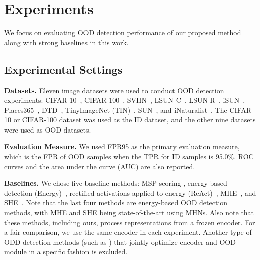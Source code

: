\section{Experiments}

We focus on evaluating OOD detection performance of our proposed method along with strong baselines in this work.

\subsection{Experimental Settings}


\noindent \textbf{Datasets.}
Eleven image datasets were used to conduct OOD detection experiments:
CIFAR-10~\cite{krizhevsky2009cifar}, CIFAR-100~\cite{krizhevsky2009cifar},
SVHN~\cite{netzer2011svhn}, LSUN-C~\cite{yu2015lsun}, LSUN-R~\cite{yu2015lsun}, iSUN~\cite{Xu2015iSun}, Places365~\cite{zhou2017places}, DTD~\cite{cimpoi2014DTD}, TinyImageNet (TIN)~\cite{deng2009imagenet}, SUN~\cite{xiao2010sun}, and iNaturalist~\cite{van2018inaturalist}.
The CIFAR-10 or CIFAR-100 dataset was used as the ID dataset, and the other nine datasets were used as OOD datasets.

\noindent \textbf{Evaluation Measure.}
We used FPR95 as the primary evaluation measure, which is the FPR of OOD samples when the TPR for ID samples is 95.0\%.
ROC curves and the area under the curve (AUC) are also reported.

\noindent \textbf{Baselines.}
We chose five baseline methods:
MSP scoring \cite{hendrycks2017msp},
energy-based detection (Energy)~\cite{liu2020energy},
rectified activations applied to energy (ReAct)~\cite{sun2021react},
MHE~\cite{zhang23she}, and SHE~\cite{zhang23she}.
Note that the last four methods are energy-based OOD detection methods, with MHE and SHE being state-of-the-art using MHNs.
Also note that these methods, including ours, process representations from a frozen encoder. 
For a fair comparison, we use the same encoder in each experiment.
Another type of ODD detection methods (such as \citet{zhang23she}) that jointly optimize encoder and OOD module in a specific fashion is excluded.

